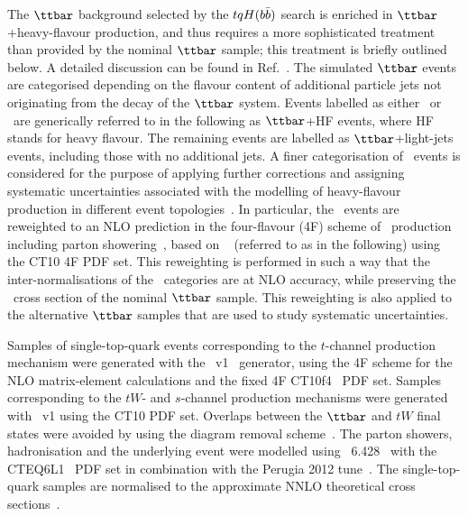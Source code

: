 The $\ttbar$ background selected by the $tqH(b\bar{b})$ search is enriched in $\ttbar$+heavy-flavour production, and thus requires a more sophisticated 
treatment than provided by the nominal $\ttbar$ sample; this treatment is briefly outlined below. A detailed discussion can be found in Ref.~\cite{Aaboud:2017rss}.
The simulated $\ttbar$ events are categorised depending 
on the flavour content of additional particle jets not originating from the decay of the $\ttbar$ system.
Events labelled as either \ttbin\ or \ttcin\ are generically referred to in the following as $\ttbar$+HF events, where HF stands for heavy flavour.
The remaining events are labelled as $\ttbar$+light-jets events, including those with no additional jets. 
A finer categorisation of \ttbin\ events is considered for the purpose of applying further corrections and
assigning systematic uncertainties associated with the modelling of heavy-flavour production in different event topologies~\cite{Aaboud:2017rss}.
In particular, the \ttbin\ events are reweighted to an NLO prediction in the four-flavour (4F) scheme 
of \ttbin\ production including parton showering~\cite{Cascioli:2013era}, based on {\ShOLlong}~\cite{Gleisberg:2008ta, Cascioli:2011va} (referred to as {\ShOL} 
in the following) using the CT10 4F PDF set.  This reweighting is performed in such a way that the inter-normalisations of the \ttbin\ categories are at NLO accuracy, 
while preserving the \ttbin\ cross section of the nominal $\ttbar$ sample. 
This reweighting is also applied to the alternative $\ttbar$ samples that are used to study systematic uncertainties.

Samples of single-top-quark events corresponding to the $t$-channel production mechanism were generated with the 
{\powheg}~v1~\cite{Frederix:2012dh} generator, using the 4F scheme  for the NLO matrix-element calculations
and the fixed 4F \textsc{CT10}f\textsc{4}~\cite{Lai:2010vv} PDF set.
Samples corresponding to the $tW$- and $s$-channel production mechanisms were generated 
with {\powheg}~v1 using the CT10 PDF set. Overlaps between the $\ttbar$ and $tW$ final states were avoided by using 
the diagram removal scheme~\cite{Frixione:2005vw}.
The parton showers, hadronisation and the underlying event were modelled using {\pythia}~6.428~\cite{Sjostrand:2006za} 
with the CTEQ6L1~\cite{Pumplin:2002vw,Nadolsky:2008zw} PDF set 
in combination with the Perugia 2012 tune~\cite{Skands:2010ak}.
The single-top-quark samples are normalised to the approximate NNLO theoretical cross 
sections~\cite{Kidonakis:2011wy,Kidonakis:2010ux,Kidonakis:2010tc}. 


